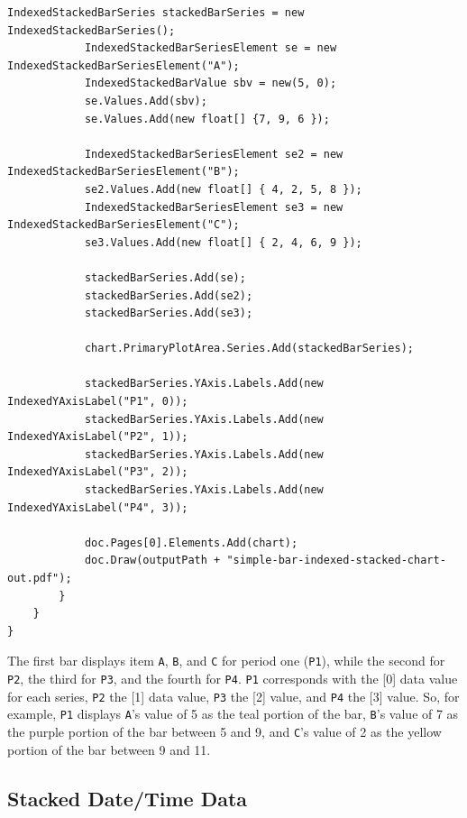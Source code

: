 \documentclass[american,letterpaper]{tufte-book}
\numberwithin{equation}{section}
\numberwithin{figure}{section}
\begin{document}
{\begin{lstlisting}[caption={Stacked bar chart with indexed data example.},label={lis:Stacked-bar-chart},basicstyle={\small\ttfamily},breaklines=true]
            IndexedStackedBarSeries stackedBarSeries = new IndexedStackedBarSeries();
            IndexedStackedBarSeriesElement se = new IndexedStackedBarSeriesElement("A");
            IndexedStackedBarValue sbv = new(5, 0);
            se.Values.Add(sbv);
            se.Values.Add(new float[] {7, 9, 6 });

            IndexedStackedBarSeriesElement se2 = new IndexedStackedBarSeriesElement("B");
            se2.Values.Add(new float[] { 4, 2, 5, 8 });
            IndexedStackedBarSeriesElement se3 = new IndexedStackedBarSeriesElement("C");
            se3.Values.Add(new float[] { 2, 4, 6, 9 });

            stackedBarSeries.Add(se);
            stackedBarSeries.Add(se2);
            stackedBarSeries.Add(se3);

            chart.PrimaryPlotArea.Series.Add(stackedBarSeries);

            stackedBarSeries.YAxis.Labels.Add(new IndexedYAxisLabel("P1", 0));
            stackedBarSeries.YAxis.Labels.Add(new IndexedYAxisLabel("P2", 1));
            stackedBarSeries.YAxis.Labels.Add(new IndexedYAxisLabel("P3", 2));
            stackedBarSeries.YAxis.Labels.Add(new IndexedYAxisLabel("P4", 3));
            
            doc.Pages[0].Elements.Add(chart);
            doc.Draw(outputPath + "simple-bar-indexed-stacked-chart-out.pdf");
        }
    }
}
\end{lstlisting}
\leavevmode\egroup

The first bar displays item \texttt{A}, \texttt{B}, and \texttt{C}
for period one (\texttt{P1}), while the second for \texttt{P2}, the
third for \texttt{P3}, and the fourth for \texttt{P4}. \texttt{P1}
corresponds with the {[}0{]} data value for each series, \texttt{P2}
the {[}1{]} data value, \texttt{P3} the {[}2{]} value, and \texttt{P4}
the {[}3{]} value. So, for example, \texttt{P1} displays \texttt{A}'s
value of 5 as the teal portion of the bar, \texttt{B}'s value of 7
as the purple portion of the bar between 5 and 9, and \texttt{C}'s
value of 2 as the yellow portion of the bar between 9 and 11.

\subsection{Stacked Date/Time Data}

}
\end{document}
